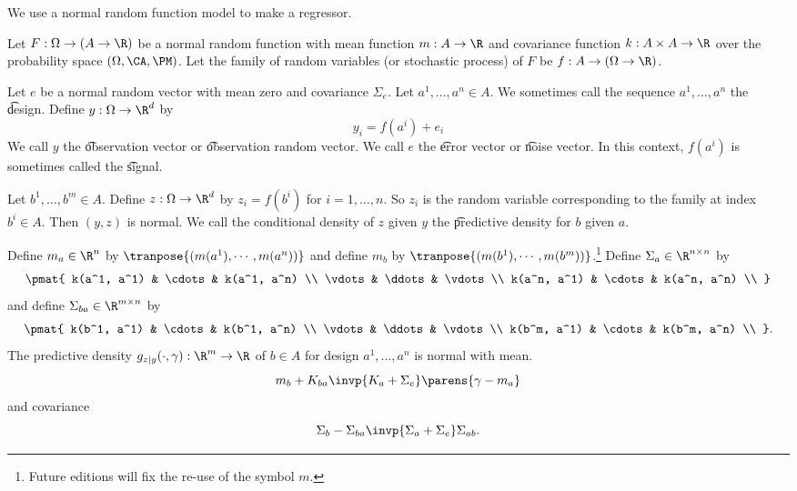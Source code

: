 

We use a normal random function model to make a regressor.


Let $F: \Omega \to (A \to \R)$ be a normal random function with mean function $m: A \to \R$ and covariance function $k: A \times A \to \R$ over the probability space $(\Omega, \CA, \PM)$.
Let the family of random variables (or stochastic process) of $F$ be $f: A \to (\Omega \to \R)$.

Let $e$ be a normal random vector with mean zero and covariance $\Sigma_{e}$.
Let $a^1, \dots, a^n \in A$.
We sometimes call the sequence $a^1, \dots, a^n$ the \t{design}.
Define $y: \Omega \to \R^d$ by
\[
  y_i = f(a^i) + e_i
\]
We call $y$ the \t{observation vector} or \t{observation random vector}.
We call $e$ the \t{error vector} or \t{noise vector}.
In this context, $f(a^i)$ is sometimes called the \t{signal}.

Let $b^1, \dots, b^m \in A$.
Define $z: \Omega \to \R^d$ by $z_i = f(b^i)$ for $i = 1, \dots, n$.
So $z_i$ is the random variable corresponding to the family at index $b^i \in A$.
Then $(y, z)$ is normal.
We call the conditional density of $z$ given $y$ the \t{predictive density} for $b$ given $a$.

\begin{proposition}
  Define $m_{a} \in \R^{n}$ by $\tranpose{(m(a^1),\cdots,m(a^n))}$ and define $m_{b}$ by $\tranpose{(m(b^1), \cdots, m(b^m))}$.\footnote{Future editions will fix the re-use of the symbol $m$.}
  Define $\Sigma_a \in \R^{n \times n}$ by
  \[
    \pmat{
      k(a^1, a^1) & \cdots & k(a^1, a^n) \\
      \vdots & \ddots & \vdots \\
      k(a^n, a^1) & \cdots & k(a^n, a^n) \\
    }
  \]
  and define $\Sigma_{ba} \in \R^{m \times n}$ by
  \[
    \pmat{
      k(b^1, a^1) & \cdots & k(b^1, a^n) \\
      \vdots & \ddots & \vdots \\
      k(b^m, a^1) & \cdots & k(b^m, a^n) \\
    }.
  \]
  The predictive density $g_{z \mid y}(\cdot, \gamma): \R^m \to \R$ of $b \in A$ for design $a^1, \dots, a^n$ is normal with mean.
  \[
    m_b  + K_{ba}\invp{K_{a} + \Sigma_{e}}\parens{\gamma - m_a}
  \]
  and covariance
  \[
    \Sigma_{b} - \Sigma_{ba}\invp{\Sigma_{a} + \Sigma_{e}}\Sigma_{ab}.
  \]
\end{proposition}
